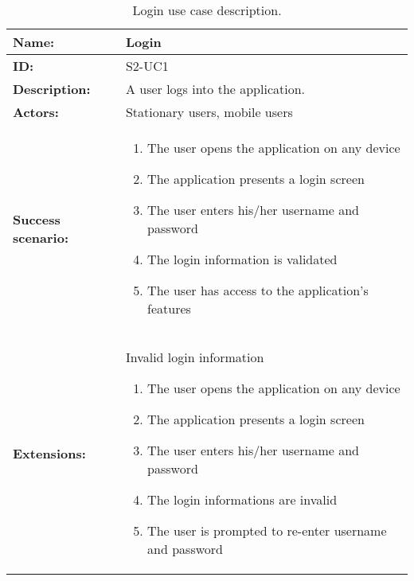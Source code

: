 \begin{table}[h!]
    \centering
    \begin{tabularx}{\textwidth}{|l|X|}
        \hline
        \textbf{Name:}  & Login \\ \hline
        \textbf{ID:}    & S2-UC1 \\ \hline
        \textbf{Description:} & A user logs into the application. \\ \hline
        \textbf{Actors:} & Stationary users, mobile users \\ \hline
        \textbf{Success scenario:} & 
        \begin{enumerate}
            \item The user opens the application on any device
            \item The application presents a login screen
            \item The user enters his/her username and password
            \item The login information is validated
            \item The user has access to the application's features
        \end{enumerate}
        \\ \hline
        \textbf{Extensions:} & Invalid login information \newline
        \begin{enumerate}
            \item The user opens the application on any device
            \item The application presents a login screen
            \item The user enters his/her username and password
            \item The login informations are invalid
            \item The user is prompted to re-enter username and password
        \end{enumerate}
        \\ \hline
    \end{tabularx}
    \caption{Login use case description.}
    \label{tab:s2-uc1}
\end{table}


